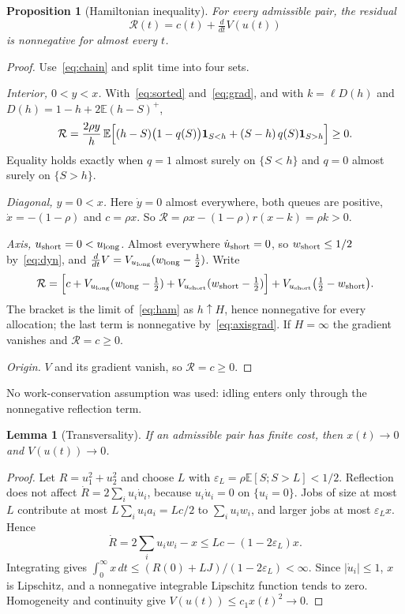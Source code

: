 \documentclass[11pt]{article}
\numberwithin{equation}{section}
\newtheorem{lemma}[theorem]{Lemma}
\newtheorem{proposition}[theorem]{Proposition}
\theoremstyle{definition}
\theoremstyle{remark}
\newcommand{\E}{\mathbb{E}}
\newcommand{\one}{\mathbf{1}}
\begin{document}
\begin{proposition}[Hamiltonian inequality]\label{prop:ham}
For every admissible pair, the residual
\begin{equation}\label{eq:residual}
\mathcal R(t)=c(t)+\tfrac{d}{dt}V(u(t))
\end{equation}
is nonnegative for almost every $t$.
\end{proposition}

\begin{proof}
Use~\eqref{eq:chain} and split time into four sets.

\emph{Interior, $0<y<x$.} With~\eqref{eq:sorted} and~\eqref{eq:grad}, and with $k=\ell D(h)$ and $D(h)=1-h+2\E(h-S)^+$,
\begin{equation}\label{eq:ham}
\mathcal R=\frac{2\rho y}{h}\,\E\Bigl[(h-S)\bigl(1-q(S)\bigr)\one_{S<h}+(S-h)\,q(S)\one_{S>h}\Bigr]\ge0 .
\end{equation}
Equality holds exactly when $q=1$ almost surely on $\{S<h\}$ and $q=0$ almost surely on $\{S>h\}$.

\emph{Diagonal, $y=0<x$.} Here $\dot y=0$ almost everywhere, both queues are positive, $\dot x=-(1-\rho)$ and $c=\rho x$. So $\mathcal R=\rho x-(1-\rho)r(x-k)=\rho k>0$.

\emph{Axis, $u_{\rm short}=0<u_{\rm long}$.} Almost everywhere $\dot u_{\rm short}=0$, so $w_{\rm short}\le1/2$ by~\eqref{eq:dyn}, and $\frac{d}{dt}V=V_{u_{\rm long}}(w_{\rm long}-\frac12)$. Write
\[
\mathcal R=\Bigl[c+V_{u_{\rm long}}(w_{\rm long}-\tfrac12)+V_{u_{\rm short}}(w_{\rm short}-\tfrac12)\Bigr]+V_{u_{\rm short}}\bigl(\tfrac12-w_{\rm short}\bigr).
\]
The bracket is the limit of~\eqref{eq:ham} as $h\uparrow H$, hence nonnegative for every allocation; the last term is nonnegative by~\eqref{eq:axisgrad}. If $H=\infty$ the gradient vanishes and $\mathcal R=c\ge0$.

\emph{Origin.} $V$ and its gradient vanish, so $\mathcal R=c\ge0$.
\end{proof}

No work-conservation assumption was used: idling enters only through the nonnegative reflection term.

\begin{lemma}[Transversality]\label{lem:transv}
If an admissible pair has finite cost, then $x(t)\to0$ and $V(u(t))\to0$.
\end{lemma}

\begin{proof}
Let $R=u_1^2+u_2^2$ and choose $L$ with $\varepsilon_L=\rho\E[S;S>L]<1/2$. Reflection does not affect $\dot R=2\sum_iu_i\dot u_i$, because $u_i\dot u_i=0$ on $\{u_i=0\}$. Jobs of size at most $L$ contribute at most $L\sum_iu_ia_i=Lc/2$ to $\sum_iu_iw_i$, and larger jobs at most $\varepsilon_Lx$. Hence
\[
\dot R=2\sum_iu_iw_i-x\le Lc-(1-2\varepsilon_L)x .
\]
Integrating gives $\int_0^\infty x\,dt\le(R(0)+LJ)/(1-2\varepsilon_L)<\infty$. Since $|\dot u_i|\le1$, $x$ is Lipschitz, and a nonnegative integrable Lipschitz function tends to zero. Homogeneity and continuity give $V(u(t))\le c_1x(t)^2\to0$.
\end{proof}
\end{document}
